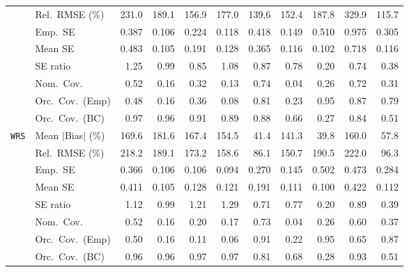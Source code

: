 \begin{landscape}
\begin{longtable}{llrrrrrrrrr}
 & Rel.\ RMSE (\%) & 231.0 & 189.1 & 156.9 & 177.0 & \cellcolor{ranktwo}139.6 & \cellcolor{rankthree}152.4 & 187.8 & 329.9 & \cellcolor{rankone}115.7 \\
 & Emp.\ SE & 0.387 & 0.106 & 0.224 & 0.118 & 0.418 & 0.149 & 0.510 & 0.975 & 0.305 \\
 & Mean SE & 0.483 & 0.105 & 0.191 & 0.128 & 0.365 & 0.116 & 0.102 & 0.718 & 0.116 \\
 & SE ratio & 1.25 & \cellcolor{rankone}0.99 & 0.85 & \cellcolor{ranktwo}1.08 & \cellcolor{rankthree}0.87 & 0.78 & 0.20 & 0.74 & 0.38 \\
 & Nom.\ Cov. & \cellcolor{rankthree}0.52 & 0.16 & 0.32 & 0.13 & \cellcolor{rankone}0.74 & 0.04 & 0.26 & \cellcolor{ranktwo}0.72 & 0.31 \\
 & Orc.\ Cov.\ (Emp) & 0.48 & 0.16 & 0.36 & 0.08 & \cellcolor{rankthree}0.81 & 0.23 & \cellcolor{rankone}0.95 & \cellcolor{ranktwo}0.87 & 0.79 \\
 & Orc.\ Cov.\ (BC) & \cellcolor{ranktwo}0.97 & \cellcolor{rankone}0.96 & \cellcolor{rankthree}0.91 & 0.89 & 0.88 & 0.66 & 0.27 & 0.84 & 0.51 \\
\addlinespace[2pt]
\quad \texttt{WRS} & Mean $|$Bias$|$ (\%) & 169.6 & 181.6 & 167.4 & 154.5 & \cellcolor{ranktwo}41.4 & 141.3 & \cellcolor{rankone}39.8 & 160.0 & \cellcolor{rankthree}57.8 \\
 & Rel.\ RMSE (\%) & 218.2 & 189.1 & 173.2 & 158.6 & \cellcolor{rankone}86.1 & \cellcolor{rankthree}150.7 & 190.5 & 222.0 & \cellcolor{ranktwo}96.3 \\
 & Emp.\ SE & 0.366 & 0.106 & 0.106 & 0.094 & 0.270 & 0.145 & 0.502 & 0.473 & 0.284 \\
 & Mean SE & 0.411 & 0.105 & 0.128 & 0.121 & 0.191 & 0.111 & 0.100 & 0.422 & 0.112 \\
 & SE ratio & \cellcolor{rankthree}1.12 & \cellcolor{rankone}0.99 & 1.21 & 1.29 & 0.71 & 0.77 & 0.20 & \cellcolor{ranktwo}0.89 & 0.39 \\
 & Nom.\ Cov. & \cellcolor{rankthree}0.52 & 0.16 & 0.20 & 0.17 & \cellcolor{rankone}0.73 & 0.04 & 0.26 & \cellcolor{ranktwo}0.60 & 0.37 \\
 & Orc.\ Cov.\ (Emp) & 0.50 & 0.16 & 0.11 & 0.06 & \cellcolor{ranktwo}0.91 & 0.22 & \cellcolor{rankone}0.95 & 0.65 & \cellcolor{rankthree}0.87 \\
 & Orc.\ Cov.\ (BC) & \cellcolor{rankone}0.96 & \cellcolor{rankone}0.96 & \cellcolor{ranktwo}0.97 & \cellcolor{ranktwo}0.97 & \cellcolor{rankthree}0.81 & 0.68 & 0.28 & \cellcolor{ranktwo}0.93 & 0.51 \\

\end{longtable}
\end{landscape}
